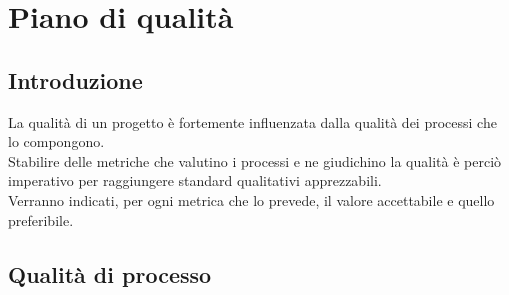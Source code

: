 \chapter{Piano di qualità}

\section{Introduzione}
\label{sec:qualityintro}
La qualità di un progetto è fortemente influenzata dalla qualità dei processi che lo compongono.\\ Stabilire delle metriche che valutino i processi e ne giudichino la qualità è perciò imperativo per raggiungere standard qualitativi apprezzabili.\\ Verranno indicati, per ogni metrica che lo prevede, il valore accettabile e quello preferibile.

\section{Qualità di processo} \label{sec:qualityproc}

